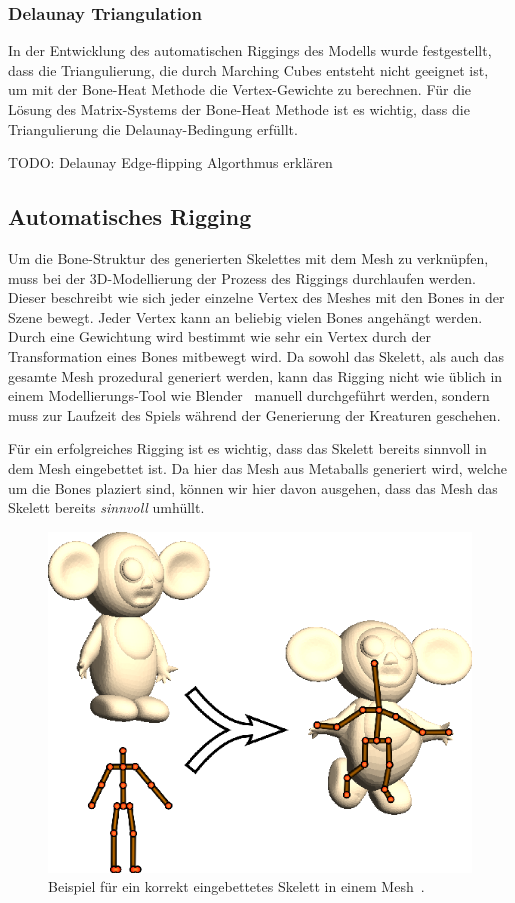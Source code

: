 \subsubsection{Delaunay Triangulation}
In der Entwicklung des automatischen Riggings des Modells wurde festgestellt, dass die Triangulierung, die durch Marching Cubes entsteht nicht geeignet ist, um mit der Bone-Heat Methode die Vertex-Gewichte zu berechnen. Für die Lösung des Matrix-Systems der Bone-Heat Methode ist es wichtig, dass die Triangulierung die Delaunay-Bedingung erfüllt.

TODO: Delaunay Edge-flipping Algorthmus erklären

\subsection{Automatisches Rigging}
Um die Bone-Struktur des generierten Skelettes mit dem Mesh zu verknüpfen, muss bei der 3D-Modellierung der Prozess des Riggings durchlaufen werden. Dieser beschreibt wie sich jeder einzelne Vertex des Meshes mit den Bones in der Szene bewegt. Jeder Vertex kann an beliebig vielen Bones angehängt werden. Durch eine Gewichtung wird bestimmt wie sehr ein Vertex durch der Transformation eines Bones mitbewegt wird.
Da sowohl das Skelett, als auch das gesamte Mesh prozedural generiert werden, kann das Rigging nicht wie üblich in einem Modellierungs-Tool wie Blender~\cite{blender} manuell durchgeführt werden, sondern muss zur Laufzeit des Spiels während der Generierung der Kreaturen geschehen.

Für ein erfolgreiches Rigging ist es wichtig, dass das Skelett bereits sinnvoll in dem Mesh eingebettet ist. Da hier das Mesh aus Metaballs generiert wird, welche um die Bones plaziert sind, können wir hier davon ausgehen, dass das Mesh das Skelett bereits \emph{sinnvoll} umhüllt.

\begin{figure}[h!]
	\centering
	\includegraphics[width=0.6\linewidth]{resources/img/skeleton_embedding.png}
	\caption{Beispiel für ein korrekt eingebettetes Skelett in einem Mesh~\cite{bone_heat_paper}.}
	\label{fig:skeleton_embedding}
\end{figure}

